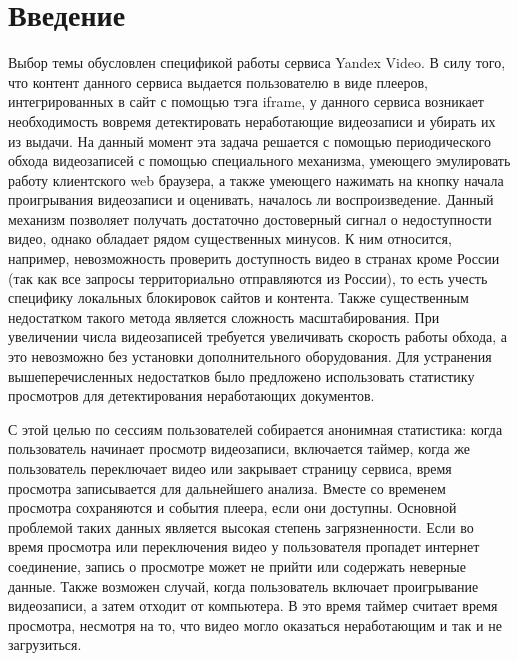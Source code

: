 




\chapter{Введение}

Выбор темы обусловлен спецификой работы сервиса Yandex Video. В силу того, что контент данного сервиса выдается пользователю в виде плееров, интегрированных в сайт с помощью тэга iframe, у данного сервиса возникает необходимость вовремя детектировать неработающие видеозаписи и убирать их из выдачи. На данный момент эта задача решается с помощью периодического обхода видеозаписей с помощью специального механизма, умеющего эмулировать работу клиентского web браузера, а также умеющего нажимать на кнопку начала проигрывания видеозаписи и оценивать, началось ли воспроизведение. Данный механизм позволяет получать достаточно достоверный сигнал о недоступности видео, однако обладает рядом существенных минусов. К ним относится, например, невозможность проверить доступность видео в странах кроме России (так как все запросы территориально отправляются из России), то есть учесть специфику локальных блокировок сайтов и контента. Также существенным недостатком такого метода является сложность масштабирования. При увеличении числа видеозаписей требуется увеличивать скорость работы обхода, а это невозможно без установки дополнительного оборудования. Для устранения вышеперечисленных недостатков было предложено использовать статистику просмотров для детектирования неработающих документов.

С этой целью по сессиям пользователей собирается анонимная статистика: когда пользователь начинает просмотр видеозаписи, включается таймер, когда же пользователь переключает видео или закрывает страницу сервиса, время просмотра записывается для дальнейшего анализа. Вместе со временем просмотра сохраняются и события плеера, если они доступны. Основной проблемой таких данных является высокая степень загрязненности. Если во время просмотра или переключения видео у пользователя пропадет интернет соединение, запись о просмотре может не прийти или содержать неверные данные. Также возможен случай, когда пользователь включает проигрывание видеозаписи, а затем отходит от компьютера. В это время таймер считает время просмотра, несмотря на то, что видео могло оказаться неработающим и так и не загрузиться.

